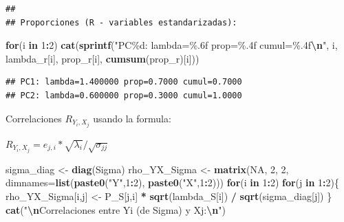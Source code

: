 \documentclass[
]{book}
\newenvironment{Shaded}{\begin{snugshade}}{\end{snugshade}}
\newcommand{\AttributeTok}[1]{\textcolor[rgb]{0.13,0.29,0.53}{#1}}
\newcommand{\ConstantTok}[1]{\textcolor[rgb]{0.56,0.35,0.01}{#1}}
\newcommand{\ControlFlowTok}[1]{\textcolor[rgb]{0.13,0.29,0.53}{\textbf{#1}}}
\newcommand{\DecValTok}[1]{\textcolor[rgb]{0.00,0.00,0.81}{#1}}
\newcommand{\FunctionTok}[1]{\textcolor[rgb]{0.13,0.29,0.53}{\textbf{#1}}}
\newcommand{\NormalTok}[1]{#1}
\newcommand{\OtherTok}[1]{\textcolor[rgb]{0.56,0.35,0.01}{#1}}
\newcommand{\SpecialCharTok}[1]{\textcolor[rgb]{0.81,0.36,0.00}{\textbf{#1}}}
\newcommand{\StringTok}[1]{\textcolor[rgb]{0.31,0.60,0.02}{#1}}
\begin{document}
\begin{verbatim}
## 
## Proporciones (R - variables estandarizadas):
\end{verbatim}

\begin{Shaded}
\begin{Highlighting}[]
\ControlFlowTok{for}\NormalTok{(i }\ControlFlowTok{in} \DecValTok{1}\SpecialCharTok{:}\DecValTok{2}\NormalTok{) }\FunctionTok{cat}\NormalTok{(}\FunctionTok{sprintf}\NormalTok{(}\StringTok{"PC\%d: lambda=\%.6f prop=\%.4f cumul=\%.4f}\SpecialCharTok{\textbackslash{}n}\StringTok{"}\NormalTok{,}
\NormalTok{                          i, lambda\_r[i], prop\_r[i], }\FunctionTok{cumsum}\NormalTok{(prop\_r)[i]))}
\end{Highlighting}
\end{Shaded}

\begin{verbatim}
## PC1: lambda=1.400000 prop=0.7000 cumul=0.7000
## PC2: lambda=0.600000 prop=0.3000 cumul=1.0000
\end{verbatim}

Correlaciones \(R_{Y_i, X_j}\) usando la formula:

\(R_{Y_i, X_j} = e_{j,i} * \sqrt{\lambda_i} / \sqrt{\sigma_{jj}}\)

\begin{Shaded}
\begin{Highlighting}[]
\NormalTok{sigma\_diag }\OtherTok{\textless{}{-}} \FunctionTok{diag}\NormalTok{(Sigma)}
\NormalTok{rho\_YX\_Sigma }\OtherTok{\textless{}{-}} \FunctionTok{matrix}\NormalTok{(}\ConstantTok{NA}\NormalTok{, }\DecValTok{2}\NormalTok{, }\DecValTok{2}\NormalTok{, }\AttributeTok{dimnames=}\FunctionTok{list}\NormalTok{(}\FunctionTok{paste0}\NormalTok{(}\StringTok{"Y"}\NormalTok{,}\DecValTok{1}\SpecialCharTok{:}\DecValTok{2}\NormalTok{), }\FunctionTok{paste0}\NormalTok{(}\StringTok{"X"}\NormalTok{,}\DecValTok{1}\SpecialCharTok{:}\DecValTok{2}\NormalTok{)))}
\ControlFlowTok{for}\NormalTok{(i }\ControlFlowTok{in} \DecValTok{1}\SpecialCharTok{:}\DecValTok{2}\NormalTok{) }\ControlFlowTok{for}\NormalTok{(j }\ControlFlowTok{in} \DecValTok{1}\SpecialCharTok{:}\DecValTok{2}\NormalTok{)\{}
\NormalTok{  rho\_YX\_Sigma[i,j] }\OtherTok{\textless{}{-}}\NormalTok{ P\_S[j,i] }\SpecialCharTok{*} \FunctionTok{sqrt}\NormalTok{(lambda\_S[i]) }\SpecialCharTok{/} \FunctionTok{sqrt}\NormalTok{(sigma\_diag[j])}
\NormalTok{\}}
\FunctionTok{cat}\NormalTok{(}\StringTok{"}\SpecialCharTok{\textbackslash{}n}\StringTok{Correlaciones entre Yi (de Sigma) y Xj:}\SpecialCharTok{\textbackslash{}n}\StringTok{"}\NormalTok{)}
\end{Highlighting}
\end{Shaded}
\end{document}
